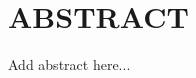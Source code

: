 \clearpage

\section*{\centering \large ABSTRACT}

\vspace{2em}

\begin{doublespace}
  \justifying
  \noindent
  Add abstract here...
\end{doublespace}

\newpage
